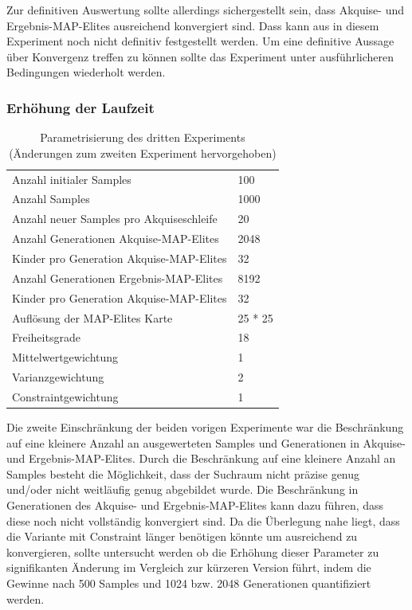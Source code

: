 
Zur definitiven Auswertung sollte allerdings sichergestellt sein, dass Akquise- und Ergebnis-MAP-Elites ausreichend konvergiert sind.
Dass kann aus in diesem Experiment noch nicht definitiv festgestellt werden.
Um eine definitive Aussage über Konvergenz treffen zu können sollte das Experiment unter ausführlicheren Bedingungen wiederholt werden.

\subsubsection{Erhöhung der Laufzeit}
\label{sub:exp3rd}
\begin{table}[h]
	\centering
	\begin{tabularx}{.75\textwidth}{ll}\hline
		Anzahl initialer Samples & 100 \\
		Anzahl Samples & 1000 \\
		Anzahl neuer Samples pro Akquiseschleife & 20 \\
		Anzahl Generationen Akquise-MAP-Elites & 2048 \\
		Kinder pro Generation Akquise-MAP-Elites & 32 \\
		Anzahl Generationen Ergebnis-MAP-Elites & 8192 \\
		Kinder pro Generation Akquise-MAP-Elites & 32 \\
		Auflösung der MAP-Elites Karte & 25 * 25  \\
		\hline
		Freiheitsgrade & 18 \\
		Mittelwertgewichtung & 1 \\
		Varianzgewichtung & 2 \\
		Constraintgewichtung & 1 \\
	\end{tabularx}
	\label{tab:params3rd}
	\caption{Parametrisierung des dritten Experiments (Änderungen zum zweiten Experiment hervorgehoben)}
\end{table}

Die zweite Einschränkung der beiden vorigen Experimente war die Beschränkung auf eine kleinere Anzahl an ausgewerteten Samples und Generationen in Akquise- und Ergebnis-MAP-Elites.
Durch die Beschränkung auf eine kleinere Anzahl an Samples besteht die Möglichkeit, dass der Suchraum nicht präzise genug und/oder nicht weitläufig genug abgebildet wurde.
Die Beschränkung in Generationen des Akquise- und Ergebnis-MAP-Elites kann dazu führen, dass diese noch nicht vollständig konvergiert sind.
Da die Überlegung nahe liegt, dass die Variante mit Constraint länger benötigen könnte um ausreichend zu konvergieren, sollte untersucht werden ob die Erhöhung dieser Parameter zu signifikanten Änderung im Vergleich zur kürzeren Version führt, indem die Gewinne nach 500 Samples und 1024 bzw. 2048 Generationen quantifiziert werden.

